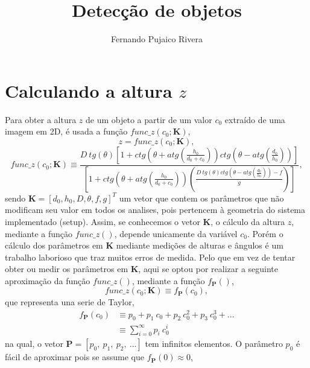 \documentclass[12pt]{article}
\title{Detecção de objetos }
\author{Fernando Pujaico Rivera}
\date{}
\begin{document}
\maketitle


\section{Calculando a altura $z$}
Para obter a altura $z$ de um objeto a partir de um valor $c_0$ 
extraído de uma imagem em 2D, é usada a função
$func\_z(c_0;\mathbf{K})$, 
\begin{equation}
z = func\_z(c_0;\mathbf{K}),
\end{equation}
\begin{equation}\label{eq:setupz1}
func\_z(c_0;\mathbf{K})\equiv\frac{
D~tg(\theta)
\left[
1+ ctg\left(\theta+atg\left(\frac{h_0}{d_0+c_0}\right)\right) ctg\left(\theta-atg\left(\frac{d_0}{h_0}\right)\right) 
\right]
}{
\left[1+ctg\left(\theta+atg\left(\frac{h_0}{d_0+c_0}\right)\right) \left(\frac{D~tg(\theta)ctg\left(\theta-atg\left(\frac{d_0}{h_0}\right)\right)- f}{g}\right)\right]
},
\end{equation}
sendo $\mathbf{K}=[d_0,h_0,D,\theta,f,g]^T$
um vetor que contem os parâmetros que não modificam seu valor em todos os analises,
pois pertencem à geometria do sistema implementado (setup).
Assim, se conhecemos o vetor $\mathbf{K}$, o cálculo da altura $z$, mediante a função $func\_z()$,
depende unicamente da variável $c_0$.
Porém o cálculo dos parâmetros em $\mathbf{K}$ mediante medições de alturas e ângulos
é um trabalho laborioso que traz muitos erros de medida.
Pelo que em vez de tentar obter ou medir os parâmetros em $\mathbf{K}$,
aqui se optou por realizar a seguinte aproximação da função $func\_z()$, 
mediante a função $f_{\mathbf{P}}()$, 
\begin{equation}
func\_z(c_0;\mathbf{K})\equiv f_{\mathbf{P}}(c_0),
\end{equation}
que representa una serie de Taylor,
\begin{equation}
\begin{align*}
f_{\mathbf{P}}(c_0)  &\equiv p_0+p_1~c_0+p_2~c_0^2+p_3~c_0^3+...\\ 
 &\equiv \sum_{i=0}^{\infty}p_i~c_0^i
\end{align*}
\end{equation}
na qual, o vetor $\mathbf{P}=[p_0,~p_1,~p_2,~...]$ tem infinitos elementos. 
O parâmetro $p_0$ é fácil de aproximar pois se assume que $f_{\mathbf{P}}(0)\approx 0$,
\end{document}
